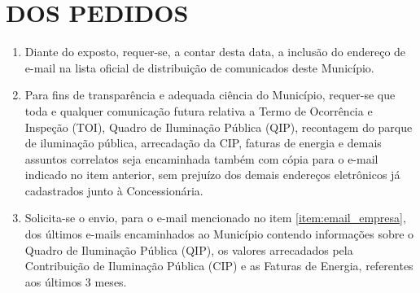 \section{DOS PEDIDOS}

\newcommand{\tipoRequerimento}{Solicitação de Inclusão de E-mails}


\begin{enumerate}[resume]
  \item Diante do exposto, requer-se, a contar desta data, a inclusão do endereço de e-mail \textbf{\EmailEmpresa} na lista oficial de distribuição de comunicados deste Município.
  \label{item:email_empresa}
  \item Para fins de transparência e adequada ciência do Município, requer-se que toda e qualquer comunicação futura relativa a Termo de Ocorrência e Inspeção (TOI), Quadro de Iluminação Pública (QIP), recontagem do parque de iluminação pública, arrecadação da CIP, faturas de energia e demais assuntos correlatos seja encaminhada também com cópia para o e-mail indicado no item anterior, sem prejuízo dos demais endereços eletrônicos já cadastrados junto à Concessionária.
  \item Solicita-se o envio, para o e-mail mencionado no item \ref{item:email_empresa}, dos últimos e-mails encaminhados ao Município contendo informações sobre o Quadro de Iluminação Pública (QIP), os valores arrecadados pela Contribuição de Iluminação Pública (CIP) e as Faturas de Energia, referentes aos últimos 3 meses.
\end{enumerate}
